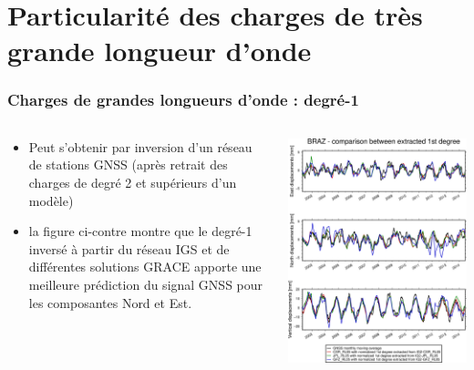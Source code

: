 \documentclass[9pt]{beamer}
\newenvironment{workblock}[1]{%
  \setbeamercolor{block body}{bg=green!10}
\begin{block}{#1}}{\end{block}}
\begin{document}


\section[Particularité des charges de...]{Particularité des charges de très grande longueur d'onde}

\begin{frame}
\frametitle{Charges de grandes longueurs d'onde : degré-1}
\begin{columns}
        \begin{column}{0.5\textwidth}
            \begin{itemize}
                \item Peut s'obtenir par inversion d'un réseau de stations GNSS (après retrait des charges de degré 2 et supérieurs d'un modèle)
                \item la figure ci-contre montre que le degré-1 inversé à partir du réseau IGS et de différentes solutions GRACE apporte une meilleure prédiction du signal GNSS pour les composantes Nord et Est. 
            \end{itemize}
        \end{column}
        \begin{column}{0.5\textwidth}
            \includegraphics[width=\textwidth]{figures/BRAZ_w1d_from_inversion.png}

\end{column}
\end{columns}
\end{frame}
\end{document}
